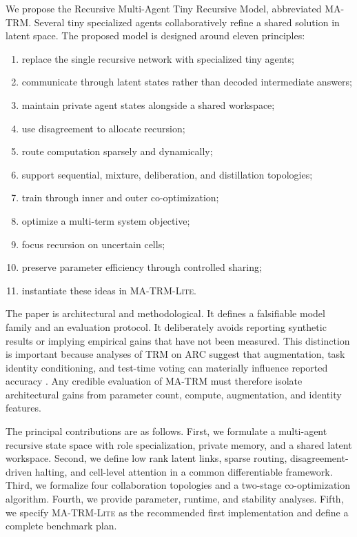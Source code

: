 \documentclass[10pt,a4paper,twocolumn]{article}
\newcommand{\MA}{\textsc{MA-TRM}}
\newcommand{\MALite}{\textsc{MA-TRM-Lite}}
\begin{document}
We propose the Recursive Multi-Agent Tiny Recursive Model, abbreviated \MA. Several tiny specialized agents collaboratively refine a shared solution in latent space. The proposed model is designed around eleven principles:
\begin{enumerate}[label=\arabic*)]
\item replace the single recursive network with specialized tiny agents;
\item communicate through latent states rather than decoded intermediate answers;
\item maintain private agent states alongside a shared workspace;
\item use disagreement to allocate recursion;
\item route computation sparsely and dynamically;
\item support sequential, mixture, deliberation, and distillation topologies;
\item train through inner and outer co-optimization;
\item optimize a multi-term system objective;
\item focus recursion on uncertain cells;
\item preserve parameter efficiency through controlled sharing;
\item instantiate these ideas in \MALite.
\end{enumerate}

The paper is architectural and methodological. It defines a falsifiable model family and an evaluation protocol. It deliberately avoids reporting synthetic results or implying empirical gains that have not been measured. This distinction is important because analyses of TRM on ARC suggest that augmentation, task identity conditioning, and test-time voting can materially influence reported accuracy \cite{royeazar2025trmanalysis}. Any credible evaluation of \MA{} must therefore isolate architectural gains from parameter count, compute, augmentation, and identity features.

The principal contributions are as follows. First, we formulate a multi-agent recursive state space with role specialization, private memory, and a shared latent workspace. Second, we define low rank latent links, sparse routing, disagreement-driven halting, and cell-level attention in a common differentiable framework. Third, we formalize four collaboration topologies and a two-stage co-optimization algorithm. Fourth, we provide parameter, runtime, and stability analyses. Fifth, we specify \MALite{} as the recommended first implementation and define a complete benchmark plan.
\end{document}
